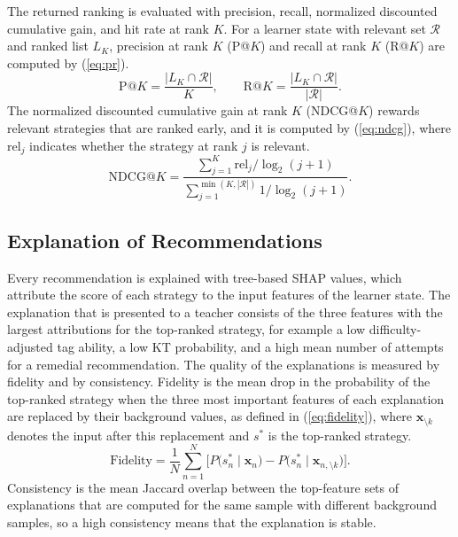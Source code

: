 \documentclass[11pt]{article}
\begin{document}
The returned ranking is evaluated with precision, recall, normalized discounted cumulative gain, and hit rate at rank $K$. For a learner state with relevant set $\mathcal{R}$ and ranked list $L_K$, precision at rank $K$ (P@$K$) and recall at rank $K$ (R@$K$) are computed by (\ref{eq:pr}).
\begin{equation}\label{eq:pr}
\text{P@}K = \frac{|L_K \cap \mathcal{R}|}{K}, \qquad \text{R@}K = \frac{|L_K \cap \mathcal{R}|}{|\mathcal{R}|}.
\end{equation}
The normalized discounted cumulative gain at rank $K$ (NDCG@$K$) rewards relevant strategies that are ranked early, and it is computed by (\ref{eq:ndcg}), where $\mathrm{rel}_j$ indicates whether the strategy at rank $j$ is relevant.
\begin{equation}\label{eq:ndcg}
\text{NDCG@}K = \frac{\sum_{j=1}^{K} \mathrm{rel}_j / \log_2(j+1)}{\sum_{j=1}^{\min(K,|\mathcal{R}|)} 1/\log_2(j+1)} .
\end{equation}

\subsection{Explanation of Recommendations}

Every recommendation is explained with tree-based SHAP values, which attribute the score of each strategy to the input features of the learner state. The explanation that is presented to a teacher consists of the three features with the largest attributions for the top-ranked strategy, for example a low difficulty-adjusted tag ability, a low KT probability, and a high mean number of attempts for a remedial recommendation. The quality of the explanations is measured by fidelity and by consistency. Fidelity is the mean drop in the probability of the top-ranked strategy when the three most important features of each explanation are replaced by their background values, as defined in (\ref{eq:fidelity}), where $\mathbf{x}_{\setminus k}$ denotes the input after this replacement and $s^{*}$ is the top-ranked strategy.
\begin{equation}\label{eq:fidelity}
\text{Fidelity} = \frac{1}{N}\sum_{n=1}^{N}\Big[P\big(s^{*}_n \mid \mathbf{x}_n\big) - P\big(s^{*}_n \mid \mathbf{x}_{n,\setminus k}\big)\Big].
\end{equation}
Consistency is the mean Jaccard overlap between the top-feature sets of explanations that are computed for the same sample with different background samples, so a high consistency means that the explanation is stable.
\end{document}
